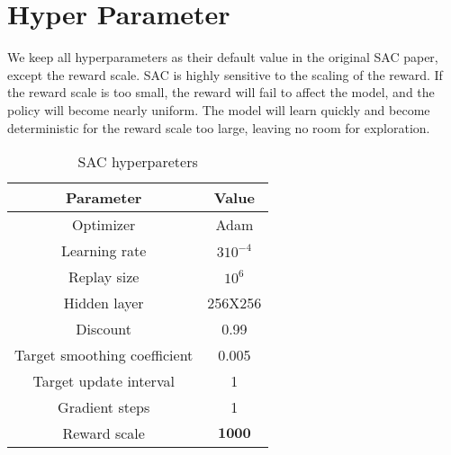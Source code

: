 \section {Hyper Parameter}
We keep all hyperparameters as their default value in the original SAC paper\cite{haarnoja2018soft}, except the reward scale.
SAC is highly sensitive to the scaling of the reward. If the reward scale is too small, the reward will fail to affect the model, and the policy will become nearly uniform. The model will learn quickly and become deterministic for the reward scale too large, leaving no room for exploration.
\par
\begin{table}[ht]
    \centering
    \begin{tabular}{| c|c | }
   \hline \hline
   Parameter & Value \\ \hline \hline
   Optimizer & Adam \\ \hline
   Learning rate & \(3 10^{-4}\) \\ \hline
   Replay size & \(10^6\) \\ \hline
   Hidden layer&   256X256  \\ \hline
   Discount & 0.99 \\ \hline
   Target smoothing coefficient & 0.005 \\ \hline
   Target update interval & 1 \\ \hline
   Gradient steps & 1 \\ \hline
   Reward scale & \(\mathbf{1000}\) \\ \hline
   \hline
    \end{tabular}
    \caption{SAC hyperpareters}
    \label{tab:hyperpareters}
\end{table} 